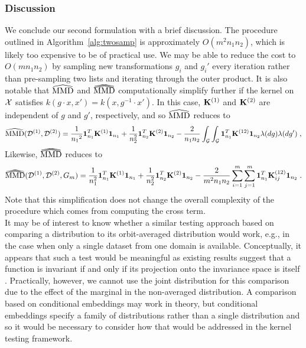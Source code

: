 \subsubsection{Discussion} \label{sec:twosamp:disc}

We conclude our second formulation with a brief discussion. The procedure outlined in Algorithm~\ref{alg:twosamp} is approximately $O(m^2n_1n_2)$, which is likely too expensive to be of practical use. We may be able to reduce the cost to $O(mn_1n_2)$ by sampling new transformations $g_i$ and $g_i'$ every iteration rather than pre-sampling two lists and iterating through the outer product. It is also notable that $\widehat{\mathrm{MMD}}$ and $\dhatMMD$ computationally simplify further if the kernel on $\mathcal{X}$ satisfies $k(g\cdot x,x')=k(x,g^{-1}\cdot x')$. In this case, $\mathbf{K}^{(1)}$ and $\mathbf{K}^{(2)}$ are independent of $g$ and $g'$, respectively, and so $\widehat{\mathrm{MMD}}$ reduces to
\[
\widehat{\mathrm{MMD}}(\mathcal{D}^{(1)},\mathcal{D}^{(2)}) = \frac{1}{{n_1}^2}\mathbf{1}_{n_1}^T\mathbf{K}^{(1)}\mathbf{1}_{n_1} + \frac{1}{n_2^2}\mathbf{1}_{n_2}^T\mathbf{K}^{(2)}\mathbf{1}_{n_2} - \frac{2}{n_1n_2}\int_{\mathcal{G}}\int_{\mathcal{G}}\mathbf{1}_{n_1}^T\mathbf{K}^{(12)}\mathbf{1}_{n_2}\lambda(dg)\lambda(dg') \;,
\]
Likewise, $\dhatMMD$ reduces to
\[
\dhatMMD(\calD^{(1)},\calD^{(2)},G_m) = \frac{1}{n_1^2}\onevec_{n_1}^T\bfK^{(1)}\onevec_{n_1} + \frac{1}{n_2^2}\onevec_{n_2}^T\bfK^{(2)}\onevec_{n_2} - \frac{2}{m^2n_1n_2}\sum_{i=1}^m\sum_{j=1}^m\onevec_{n_1}^T\bfK_{ij}^{(12)}\onevec_{n_2} \;.
\]
Note that this simplification does not change the overall complexity of the procedure which comes from computing the cross term.
\\

It may be of interest to know whether a similar testing approach based on comparing a distribution to its orbit-averaged distribution would work, e.g., in the case when only a single dataset from one domain is available. Conceptually, it appears that such a test would be meaningful as existing results suggest that a function is invariant if and only if its projection onto the invariance space is itself \parencite[Lemma~1]{Elesedy:2021}. Practically, however, we cannot use the joint distribution for this comparison due to the effect of the marginal in the non-averaged distribution. A comparison based on conditional embeddings may work in theory, but conditional embeddings specify a family of distributions rather than a single distribution \parencite{Song:2013} and so it would be necessary to consider how that would be addressed in the kernel testing framework.

\iffalse
\begin{itemize}

\item
Notation: image of $\P_X$ under $g$: $\P_{gX} = \P_{X} \circ g^{-1}$.
\[
\int \P_{gX}(dx) f(x) = \int \P_X(dx) f(gx)
\]

\end{itemize}
\fi



